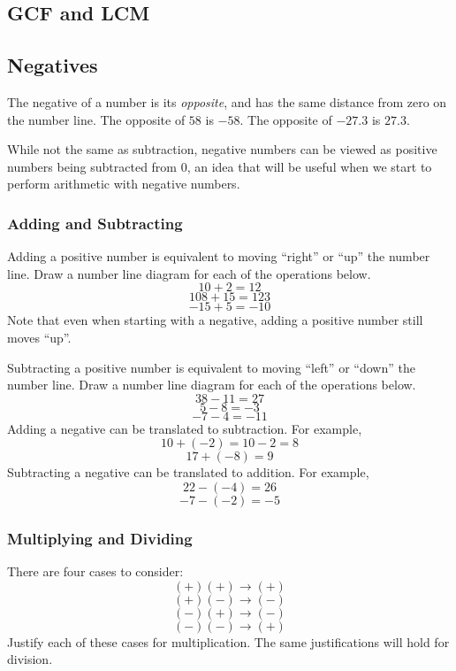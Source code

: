 \newpage 
\subsection{GCF and LCM}



\newpage 
\subsection{Negatives}
The negative of a number is its \emph{opposite}, and has the same distance from zero on the number line.  The opposite of \(58\) is \(-58\).  The opposite of \(-27.3\) is \(27.3\).  

While not the same as subtraction, negative numbers can be viewed as positive numbers being subtracted from \(0\), an idea that will be useful when we start to perform arithmetic with negative numbers.  

\subsubsection{Adding and Subtracting} 
Adding a positive number is equivalent to moving ``right'' or ``up'' the number line.  
Draw a number line diagram for each of the operations below. 
\[10 + 2 = 12  \]
\[ 108 + 15 = 123  \]
\[  -15 + 5 = -10   \]
Note that even when starting with a negative, adding a positive number still moves ``up''. 

Subtracting a positive number is equivalent to moving ``left'' or ``down'' the number line. 
Draw a number line diagram for each of the operations below. 
\[ 38 - 11 = 27 \]
\[  5-8 = -3  \]
\[  -7 - 4 = -11   \]
Adding a negative can be translated to subtraction.  For example, 
\[10 + (-2) = 10 -2 = 8 \]
\[  17 + (-8) = 9 \]
Subtracting a negative can be translated to addition.  For example, 
\[  22 - (-4) = 26 \]
\[ -7 - (-2) = -5 \]

\subsubsection{Multiplying and Dividing} 
There are four cases to consider: 
\[ (+)(+) \to (+)  \]
\[ (+)(-) \to (-)  \]
\[ (-)(+) \to (-)  \]
\[ (-)(-) \to (+)  \]
Justify each of these cases for multiplication.  The same justifications will hold for division.  

\newpage 

